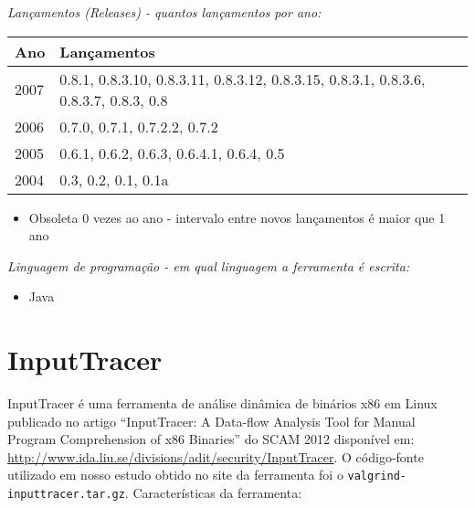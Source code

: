\begin{description}

  \item {\it Lançamentos ({\it Releases}) - quantos lançamentos por ano:}
    \begin{table}[h!]
      \centering
      \begin{tabular}{| l | l |}
        \hline
        Ano  & Lançamentos                              \\
        \hline
        2007 & 0.8.1, 0.8.3.10, 0.8.3.11, 0.8.3.12, 0.8.3.15, 0.8.3.1, 0.8.3.6, 0.8.3.7, 0.8.3, 0.8 \\
        2006 & 0.7.0, 0.7.1, 0.7.2.2, 0.7.2             \\
        2005 & 0.6.1, 0.6.2, 0.6.3, 0.6.4.1, 0.6.4, 0.5 \\
        2004 & 0.3, 0.2, 0.1, 0.1a                      \\
        \hline
      \end{tabular}
    \end{table}
    \begin{itemize}
      \item Obsoleta $0$ vezes ao ano - intervalo entre novos lançamentos é maior que 1 ano
    \end{itemize}

  \item {\it Linguagem de programação - em qual linguagem a ferramenta é escrita:}
    \begin{itemize}
      \item Java
    \end{itemize}

\end{description}

\section{InputTracer}

InputTracer é uma ferramenta de análise dinâmica de binários x86 em Linux
publicado no artigo ``InputTracer: A Data-flow Analysis Tool for Manual
Program Comprehension of x86 Binaries'' do SCAM 2012 disponível em:
\url{http://www.ida.liu.se/divisions/adit/security/InputTracer}. O
código-fonte utilizado em nosso estudo obtido no site da ferramenta foi o
\texttt{valgrind-inputtracer.tar.gz}.  Características da ferramenta:


